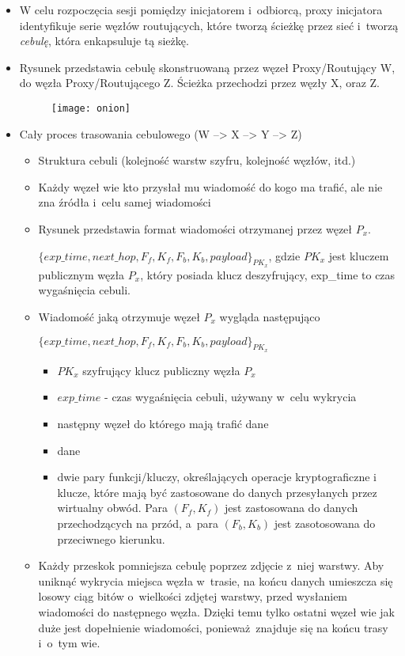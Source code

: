         \begin{itemize}
            \item W celu rozpoczęcia sesji pomiędzy inicjatorem i~odbiorcą, proxy inicjatora identyfikuje serie węzłów routujących, które tworzą ścieżkę przez sieć i~tworzą \textit{cebulę}, która enkapsuluje tą sieżkę.
            \item Rysunek przedstawia cebulę skonstruowaną przez węzeł Proxy/Routujący W, do węzła Proxy/Routującego Z. Ścieżka przechodzi przez węzły X, oraz Z.
            \begin{figure}
                \texttt{[image: onion]}
            \end{figure}
            \item Cały proces trasowania cebulowego (W --> X --> Y --> Z)
            \begin{itemize}
                \item Struktura cebuli (kolejność warstw szyfru, kolejność węzłów, itd.)
                \item Każdy węzeł wie kto przysłał mu wiadomość do kogo ma trafić, ale nie zna źródła i~celu samej wiadomości
                \item Rysunek przedstawia format wiadomości otrzymanej przez węzeł $P_x$. 
                
                $\{exp\_time, next\_hop, F_f, K_f, F_b, K_b, payload\}_{PK_x}$, gdzie $PK_x$ jest kluczem publicznym węzła $P_x$, który posiada klucz deszyfrujący, exp\_time to czas wygaśnięcia cebuli.

                \item Wiadomość jaką otrzymuje węzeł $P_x$ wygląda następująco

                $\{ exp\_time, next\_hop, F_f, K_f, F_b, K_b, payload \}_{PK_x}$
                \begin{itemize}
                    \item $PK_x$ szyfrujący klucz publiczny węzła $P_x$
                    \item $exp\_time$ - czas wygaśnięcia cebuli, używany w~celu wykrycia 
                    \item następny węzeł do którego mają trafić dane
                    \item dane
                    \item dwie pary funkcji/kluczy, określających operacje kryptograficzne i klucze, które mają być zastosowane do danych przesyłanych przez wirtualny obwód. Para $(F_f, K_f)$ jest zastosowana do danych przechodzących na przód, a~para $(F_b, K_b)$ jest zasotosowana do przeciwnego kierunku.
                \end{itemize}
                \item Każdy przeskok pomniejsza cebulę poprzez zdjęcie z~niej warstwy. Aby uniknąć wykrycia miejsca węzła w~trasie, na końcu danych umieszcza się losowy ciąg bitów o~wielkości zdjętej warstwy, przed wysłaniem wiadomości do następnego węzła. Dzięki temu tylko ostatni węzeł wie jak duże jest dopełnienie wiadomości, ponieważ znajduje się na końcu trasy i~o~tym wie.
            \end{itemize}
        \end{itemize}

